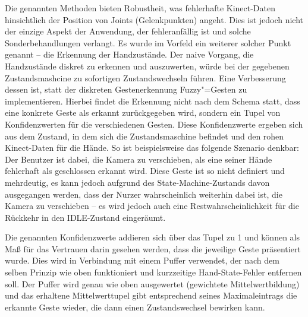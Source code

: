 	Die genannten Methoden bieten Robustheit, was fehlerhafte Kinect-Daten hinsichtlich der Position von Joints (Gelenkpunkten) angeht. Dies ist jedoch nicht der einzige Aspekt der Anwendung, der fehleranfällig ist und solche Sonderbehandlungen verlangt. Es wurde im Vorfeld ein weiterer solcher Punkt genannt -- die Erkennung der Handzustände. Der naive Vorgang, die Handzustände diskret zu erkennen und auszuwerten, würde bei der gegebenen Zustandsmashcine zu sofortigen Zustandswechseln führen. Eine Verbesserung dessen ist, statt der diskreten Gestenerkennung Fuzzy"=Gesten zu implementieren. Hierbei findet die Erkennung nicht nach dem Schema statt, dass eine konkrete Geste als erkannt zurückgegeben wird, sondern ein Tupel von Konfidenzwerten für die verschiedenen Gesten. Diese Konfidenzwerte ergeben sich aus dem Zustand, in dem sich die Zustandsmaschine befindet und den rohen Kinect-Daten für die Hände. So ist beispielsweise das folgende Szenario denkbar: Der Benutzer ist dabei, die Kamera zu verschieben, als eine seiner Hände fehlerhaft als geschlossen erkannt wird. Diese \glqq{}Geste\grqq{} ist so nicht definiert und mehrdeutig, es kann jedoch aufgrund des State-Machine-Zustands davon ausgegangen werden, dass der Nurzer wahrscheinlich weiterhin dabei ist, die Kamera zu verschieben -- es wird jedoch auch eine Restwahrscheinlichkeit für die Rückkehr in den IDLE-Zustand eingeräumt.\par 
	Die genannten Konfidenzwerte addieren sich über das Tupel zu 1 und können als Maß für das Vertrauen darin gesehen werden, dass die jeweilige Geste präsentiert wurde. Dies wird in Verbindung mit einem Puffer verwendet, der nach dem selben Prinzip wie oben funktioniert und kurzzeitige Hand-State-Fehler entfernen soll. Der Puffer wird genau wie oben ausgewertet (gewichtete Mittelwertbildung) und das erhaltene Mittelwerttupel gibt entsprechend seines Maximaleintrags die erkannte Geste wieder, die dann einen Zustandswechsel bewirken kann.\par\bigskip
